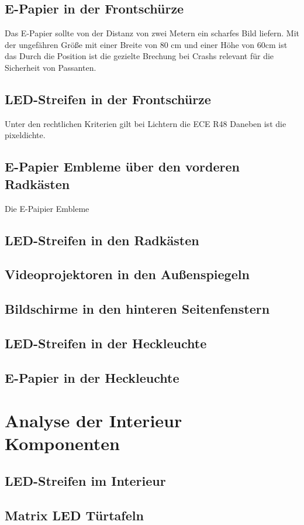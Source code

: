 \subsection{E-Papier in der Frontschürze}
Das E-Papier sollte von der Distanz von zwei Metern ein scharfes Bild liefern. Mit der ungefähren Größe mit einer Breite von 80 cm und einer Höhe von 60cm ist das 
Durch die Position ist die gezielte Brechung bei Crashs relevant für die Sicherheit von Passanten.
\subsection{LED-Streifen in der Frontschürze}
Unter den rechtlichen Kriterien gilt bei Lichtern die ECE R48
Daneben ist die pixeldichte.

\subsection{E-Papier Embleme über den vorderen Radkästen}
Die E-Paipier Embleme 
\subsection{LED-Streifen in den Radkästen}
\subsection{Videoprojektoren in den Außenspiegeln}
\subsection{Bildschirme in den hinteren Seitenfenstern}
\subsection{LED-Streifen in der Heckleuchte}
\subsection{E-Papier in der Heckleuchte}
\section{Analyse der Interieur Komponenten}
\subsection{LED-Streifen im Interieur}
\subsection{Matrix LED Türtafeln}
